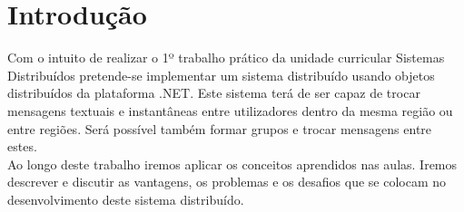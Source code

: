\chapter{Introdução}
Com o intuito de realizar o 1º trabalho prático da unidade curricular Sistemas Distribuídos pretende-se implementar um sistema distribuído usando objetos distribuídos da plataforma .NET. Este sistema terá de ser capaz de trocar mensagens textuais e instantâneas entre utilizadores dentro da mesma região ou entre regiões. Será possível também formar grupos e trocar mensagens entre estes.\\

Ao longo deste trabalho iremos aplicar os conceitos aprendidos nas aulas. Iremos descrever e discutir as vantagens, os problemas e os desafios que se colocam no desenvolvimento deste sistema distribuído.